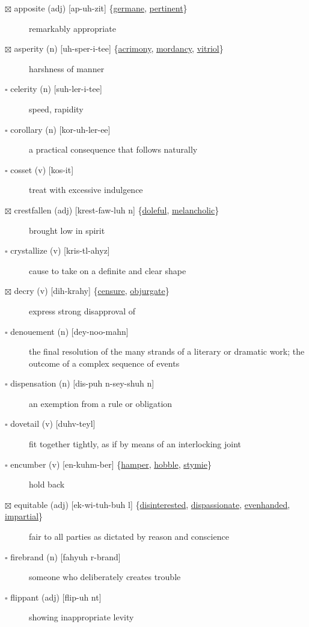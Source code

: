 \documentclass[11pt]{article}
\begin{document}
\begin{description}
\item[{$\boxtimes$ \label{org609a5a6}apposite (adj) [ap-uh-zit] \{\hyperref[orgde699fa]{germane}, \hyperref[org93638fe]{pertinent}\}}] remarkably appropriate
\item[{$\boxtimes$ \label{org05c04a3}asperity (n) [uh-sper-i-tee] \{\hyperref[orgd57c0d6]{acrimony}, \hyperref[org0780d5c]{mordancy}, \hyperref[org7cc1ee9]{vitriol}\}}] harshness of manner
\item[{$\square$ celerity (n) [suh-ler-i-tee]}] speed, rapidity
\item[{$\square$ corollary (n) [kor-uh-ler-ee]}] a practical consequence that follows naturally
\item[{$\square$ cosset (v) [kos-it]}] treat with excessive indulgence
\item[{$\boxtimes$ \label{orga7eafdc}crestfallen (adj) [krest-faw-luh n] \{\hyperref[org0625e23]{doleful}, \hyperref[orgd6cf18c]{melancholic}\}}] brought low in spirit
\item[{$\square$ crystallize (v) [kris-tl-ahyz]}] cause to take on a definite and clear shape
\item[{$\boxtimes$ \label{org7e8d517}decry (v) [dih-krahy] \{\hyperref[orge8a51e2]{censure}, \hyperref[orgd45e5c5]{objurgate}\}}] express strong disapproval of
\item[{$\square$ denouement (n) [dey-noo-mahn]}] the final resolution of the many strands of a literary or dramatic work; the outcome of a complex sequence of events
\item[{$\square$ dispensation (n) [dis-puh n-sey-shuh n]}] an exemption from a rule or obligation
\item[{$\square$ dovetail (v) [duhv-teyl]}] fit together tightly, as if by means of an interlocking joint
\item[{$\square$ \label{org33c332c}encumber (v) [en-kuhm-ber] \{\hyperref[org9f73bfc]{hamper}, \hyperref[org9c8bffd]{hobble}, \hyperref[orgeb01fe1]{stymie}\}}] hold back
\item[{$\boxtimes$ \label{org7398f3e}equitable (adj) [ek-wi-tuh-buh l] \{\hyperref[org12598d9]{disinterested}, \hyperref[org49e3d5e]{dispassionate}, \hyperref[org142d9b2]{evenhanded}, \hyperref[orgce681fa]{impartial}\}}] fair to all parties as dictated by reason and conscience
\item[{$\square$ firebrand (n) [fahyuh r-brand]}] someone who deliberately creates trouble
\item[{$\square$ flippant (adj) [flip-uh nt]}] showing inappropriate levity

\end{description}
\end{document}
